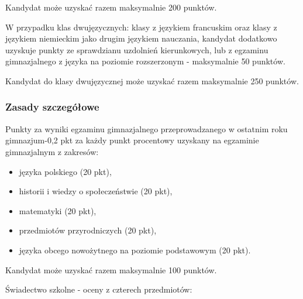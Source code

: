 \documentclass[a4paper,12pt]{scrartcl}
\newcounter{pkt}
\begin{document}
Kandydat może uzyskać razem maksymalnie 200 punktów.

W przypadku klas dwujęzycznych: klasy z językiem francuskim oraz klasy z językiem niemieckim jako drugim językiem nauczania, kandydat dodatkowo uzyskuje punkty ze sprawdzianu uzdolnień kierunkowych, lub z egzaminu gimnazjalnego z języka na poziomie rozszerzonym - maksymalnie 50 punktów.

Kandydat do klasy dwujęzycznej może uzyskać razem maksymalnie 250 punktów.

\subsubsection*{Zasady szczegółowe}

Punkty za wyniki egzaminu gimnazjalnego przeprowadzanego w ostatnim roku gimnazjum-0,2 pkt za każdy punkt procentowy uzyskany na egzaminie gimnazjalnym z zakresów: 

\begin{itemize}
  \item języka polskiego (20 pkt),
  \item historii i wiedzy o społeczeństwie (20 pkt),
  \item matematyki (20 pkt),
  \item przedmiotów przyrodniczych (20 pkt),
  \item języka obcego nowożytnego na poziomie podstawowym (20 pkt).
\end{itemize}

Kandydat może uzyskać razem maksymalnie 100 punktów.

\vspace{5mm}
Świadectwo szkolne - oceny z czterech przedmiotów:
\end{document}
